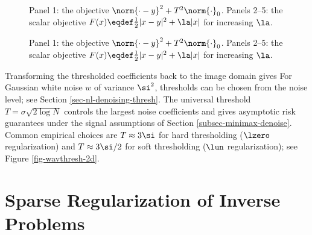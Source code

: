 \begin{figure}[tbp]
\centering
{}\hfill
{}
\caption{Panel 1: the objective $\norm{\cdot-y}^2+T^2 \norm{\cdot}_0$.
    Panels 2--5: the scalar objective $F(x) \eqdef \frac{1}{2}|x-y|^2+\la |x|$ for increasing $\la$.}
\label{fig-varspars}
\end{figure}
\begin{figure}[tbp]
\BookContinuedFigure
\centering
{}\hfill
{}\hfill
{}
\caption{Panel 1: the objective $\norm{\cdot-y}^2+T^2 \norm{\cdot}_0$.
    Panels 2--5: the scalar objective $F(x) \eqdef \frac{1}{2}|x-y|^2+\la |x|$ for increasing $\la$.}
\label{fig-varspars-continued}
\end{figure}




Transforming the thresholded coefficients back to the image domain gives
For Gaussian white noise $w$ of variance $\si^2$, thresholds can be chosen from the noise level; see Section \ref{sec-nl-denoising-thresh}. The universal threshold $T=\sigma\sqrt{2\log N}$ controls the largest noise coefficients and gives asymptotic risk guarantees under the signal assumptions of Section \ref{subsec-minimax-denoise}. Common empirical choices are $T \approx 3\si$ for hard thresholding ($\lzero$ regularization) and $T \approx 3\si/2$ for soft thresholding ($\lun$ regularization); see Figure \ref{fig-wavthresh-2d}.





\section{Sparse Regularization of Inverse Problems}
\label{sec-sparse-ip}

